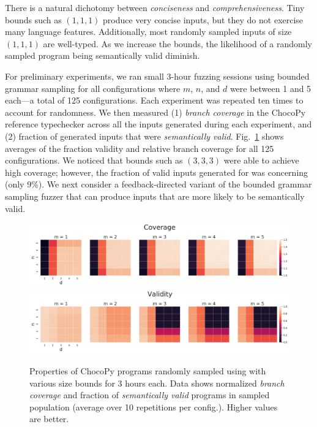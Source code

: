 \documentclass[conference]{IEEEtran}
\begin{document}
 There is a natural dichotomy between \emph{conciseness} and \emph{comprehensiveness}. Tiny bounds such as $(1, 1, 1)$ produce very concise inputs, but they do not exercise many language features. Additionally, most randomly sampled inputs of size $(1, 1, 1)$ are well-typed. As we increase the bounds, the likelihood of a randomly sampled program being semantically valid diminish.

For preliminary experiments, we ran small 3-hour fuzzing sessions using bounded grammar sampling for all configurations where $m$, $n$, and $d$ were between 1 and 5 each---a total of 125 configurations. Each experiment was repeated ten times to account for randomness. We then measured (1) \emph{branch coverage} in the ChocoPy reference typechecker across all the inputs generated during each experiment, and (2) fraction of generated inputs that were \emph{semantically valid}. Fig.~\ref{fig:chocopy-heatmaps} shows averages of the fraction validity and relative branch coverage for all 125 configurations. We noticed that bounds such as $(3, 3, 3)$ were able to achieve high coverage; however, the fraction of valid inputs generated for  was concerning (only 9\%). We next consider a feedback-directed variant of the bounded grammar sampling fuzzer that can produce inputs that are more likely to be semantically valid.




\begin{figure}[t]
    \includegraphics[scale=0.42]{total_cov_heatmaps_row_normalized.pdf}
    \includegraphics[scale=0.42]{validity_heatmaps_row.pdf}
    \caption{Properties of ChocoPy programs randomly sampled using  with various size bounds for 3 hours each. Data shows normalized \emph{branch coverage} and fraction of \emph{semantically valid} programs in sampled population (average over 10 repetitions per config.). Higher values are better.}
    \label{fig:chocopy-heatmaps}
\end{figure}
\end{document}
